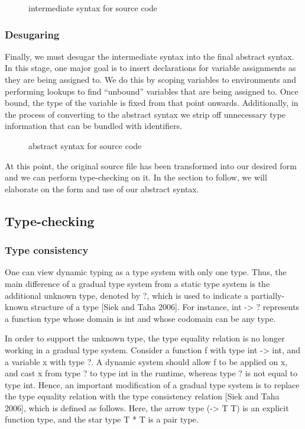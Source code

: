 \begin{figure}[h]
  \caption[]{intermediate syntax for source code}
\end{figure}

\subsubsection{Desugaring}
Finally, we must desugar the intermediate syntax into the final abstract syntax. In this stage, one major goal is to insert declarations for variable assignments as they are being assigned to. We do this by scoping variables to environments and performing lookups to find “unbound” variables that are being assigned to. Once bound, the type of the variable is fixed from that point onwards. Additionally, in the process of converting to the abstract syntax we strip off unnecessary type information that can be bundled with identifiers.

\begin{figure}[h]
  \caption[]{abstract syntax for source code}
\end{figure}

At this point, the original source file has been transformed into our desired form and we can perform type-checking on it. In the section to follow, we will elaborate on the form and use of our abstract syntax.

\subsection{Type-checking}

\subsubsection{Type consistency}
One can view dynamic typing as a type system with only one type. Thus, the main difference of a gradual type system from a static type system is the additional unknown type, denoted by ?, which is used to indicate a partially-known structure of a type [Siek and Taha 2006]. For instance, int -> ? represents a function type whose domain is int and whose codomain can be any type.

In order to support the unknown type, the type equality relation is no longer working in a gradual type system. Consider a function f with type int -> int, and a variable x with type ?. A dynamic system should allow f to be applied on x, and cast x from type ? to type int in the runtime, whereas type ? is not equal to type int. Hence, an important modification of a gradual type system is to replace the type equality relation with the type consistency relation [Siek and Taha 2006], which is defined as follows. Here, the arrow type (-> T T) is an explicit function type, and the star type T * T is a pair type.


